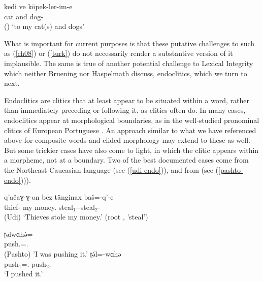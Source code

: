 \documentclass[output=paper,biblatex,babelshorthands,newtxmath,draftmode,colorlinks,citecolor=brown]{langscibook}
\begin{document}
\ea
\label{turk}
\gll kedi ve köpek-ler-im-e \\
     cat and dog- \\\hfill()
\glt `to my cat(s) and dogs'	
\z

\noindent
What is important for current purposes is that these putative challenges to  such as (\ref{ch08}) or (\ref{turk}) do not necessarily render a substantive version of it implausible. The same is true of another potential challenge to Lexical Integrity which neither Bruening nor Haspelmath discuss, endoclitics, which we turn to next.

Endoclitics are clitics that at least appear to be situated within a word, rather than immediately
preceding or following it, as clitics often do.
In many cases, endoclitics appear at morphological boundaries, as in the well-studied pronominal clitics of European Portuguese \citep{Crysmann2000a}. An approach similar to what we have referenced above for composite words and elided morphology may extend to these as well. But some trickier cases have also come to light, in which the clitic appears within a morpheme, not at a boundary. Two of the best documented cases come from the Northeast Caucasian language  \citep{Harris2000} (see (\ref{udi-endo})), and from  \citep{Tegey1977,Roberts2000,Dost2007} (see (\ref{pashto-endo}))).

\ea
\label{udi-endo}
\gll q'a\v{c}aɣ-ɣ-on bez t\"{a}nginax ba\v{s}=-q'-e\footnotemark\\
     thief- my money. steal$_{1}$--steal$_{2}$- \\\hfill(Udi)
\glt `Thieves stole my money.' (root , 'steal') 
\z

\eal
\label{pashto-endo}
\ex\label{pashto-endo-a}
\gll ʈəlwɑhə́=\footnotemark \\
     push.=. \\\hfill(Pashto)
\glt 'I was pushing it.'
\ex\label{pashto-endo-b}
\gll ʈə́l=-wɑhə\footnotemark \\
     push$_{1}$=.-push$_{2}$. \\
\glt `I pushed it.'
\zl
\end{document}
